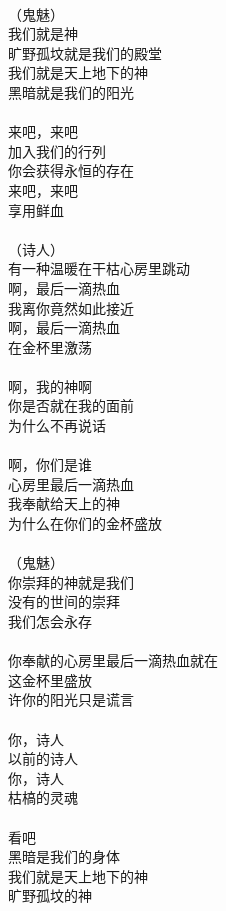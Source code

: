 \\
（鬼魅）\\
我们就是神\\
旷野孤坟就是我们的殿堂\\
我们就是天上地下的神\\
黑暗就是我们的阳光\\
\\
来吧，来吧\\
加入我们的行列\\
你会获得永恒的存在\\
来吧，来吧\\
享用鲜血\\
\\
（诗人）\\
有一种温暖在干枯心房里跳动\\
啊，最后一滴热血\\
我离你竟然如此接近\\
啊，最后一滴热血\\
在金杯里激荡\\
\\
啊，我的神啊\\
你是否就在我的面前\\
为什么不再说话\\
\\
啊，你们是谁\\
心房里最后一滴热血\\
我奉献给天上的神\\
为什么在你们的金杯盛放\\
\\
（鬼魅）\\
你崇拜的神就是我们\\
没有的世间的崇拜\\
我们怎会永存\\
\\
你奉献的心房里最后一滴热血就在\\
这金杯里盛放\\
许你的阳光只是谎言\\
\\
你，诗人\\
以前的诗人\\
你，诗人\\
枯槁的灵魂\\
\\
看吧\\
黑暗是我们的身体\\
我们就是天上地下的神\\
旷野孤坟的神\\
\\
